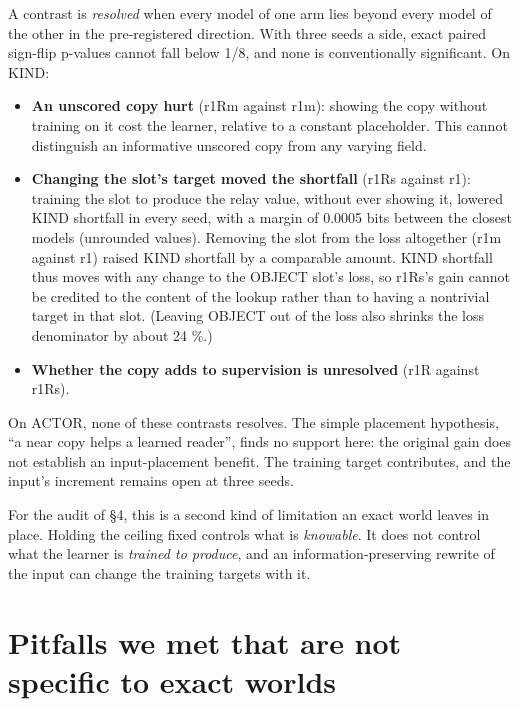 \documentclass[10pt]{article}
\providecommand{\tightlist}{\setlength{\itemsep}{0pt}\setlength{\parskip}{0pt}}
\begin{document}
A contrast is \emph{resolved} when every model of one arm lies beyond every model of the other in the pre-registered
direction. With three seeds a side, exact paired sign-flip p-values cannot fall below 1/8, and none is conventionally
significant. On KIND:

\begin{itemize}
\tightlist
\item
  \textbf{An unscored copy hurt} (r1Rm against r1m): showing the copy without training on it cost the learner, relative to a
  constant placeholder. This cannot distinguish an informative unscored copy from any varying field.
\item
  \textbf{Changing the slot's target moved the shortfall} (r1Rs against r1): training the slot to produce the relay value,
  without ever showing it, lowered KIND shortfall in every seed, with a margin of 0.0005 bits between the closest models
  (unrounded values). Removing the slot from the loss altogether (r1m against r1) raised KIND shortfall by a comparable
  amount. KIND shortfall thus moves with any change to the OBJECT slot's loss, so r1Rs's gain cannot be credited to the
  content of the lookup rather than to having a nontrivial target in that slot. (Leaving OBJECT out of the loss also shrinks the loss denominator by about 24 \%.)
\item
  \textbf{Whether the copy adds to supervision is unresolved} (r1R against r1Rs).
\end{itemize}

On ACTOR, none of these contrasts resolves. The simple placement hypothesis, ``a near copy helps a learned reader'', finds
no support here: the original gain does not establish an input-placement benefit. The training target contributes, and
the input's increment remains open at three seeds.

For the audit of §4, this is a second kind of limitation an exact world leaves in place. Holding the ceiling fixed
controls what is \emph{knowable}. It does not control what the learner is \emph{trained to produce}, and an information-preserving
rewrite of the input can change the training targets with it.

\hypertarget{pitfalls-we-met-that-are-not-specific-to-exact-worlds}{%
\section{Pitfalls we met that are not specific to exact worlds}\label{pitfalls-we-met-that-are-not-specific-to-exact-worlds}}
\end{document}
